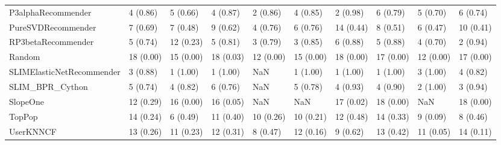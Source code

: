 \begin{tabular}{llllllllll}
                 P3alphaRecommender &                 4 (0.86) &    5 (0.66) &      4 (0.87) &     2 (0.86) &             4 (0.85) &            2 (0.98) &          6 (0.79) &           5 (0.70) &          6 (0.74) \\
                 PureSVDRecommender &                 7 (0.69) &    7 (0.48) &      9 (0.62) &     4 (0.76) &             6 (0.76) &           14 (0.44) &          8 (0.51) &           6 (0.47) &         10 (0.41) \\
                 RP3betaRecommender &                 5 (0.74) &   12 (0.23) &      5 (0.81) &     3 (0.79) &             3 (0.85) &            6 (0.88) &          5 (0.88) &           4 (0.70) &          2 (0.94) \\
                             Random &                18 (0.00) &   15 (0.00) &     18 (0.03) &    12 (0.00) &            15 (0.00) &           18 (0.00) &         17 (0.00) &          12 (0.00) &         17 (0.00) \\
          SLIMElasticNetRecommender &                 3 (0.88) &    1 (1.00) &      1 (1.00) &          NaN &             1 (1.00) &            1 (1.00) &          1 (1.00) &           3 (1.00) &          4 (0.82) \\
                    SLIM\_BPR\_Cython &                 5 (0.74) &    4 (0.82) &      6 (0.76) &          NaN &             5 (0.78) &            4 (0.93) &          4 (0.90) &           2 (1.00) &          3 (0.94) \\
                           SlopeOne &                12 (0.29) &   16 (0.00) &     16 (0.05) &          NaN &                  NaN &           17 (0.02) &         18 (0.00) &                NaN &         18 (0.00) \\
                             TopPop &                14 (0.24) &    6 (0.49) &     11 (0.40) &    10 (0.26) &            10 (0.21) &           12 (0.48) &         14 (0.33) &           9 (0.09) &          8 (0.46) \\
                          UserKNNCF &                13 (0.26) &   11 (0.23) &     12 (0.31) &     8 (0.47) &            12 (0.16) &            9 (0.62) &         13 (0.42) &          11 (0.05) &         14 (0.11) \\
\bottomrule
\end{tabular}
